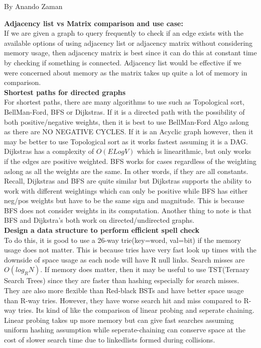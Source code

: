 \documentclass[11pt,fleqn]{article}
\begin{document}
By Anando Zaman


\textbf{Adjacency list vs Matrix comparison and use case:}\\


If we are given a graph to query frequently to check if an edge exists with the available options of using adjacency list or adjacency matrix without considering memory usage, then adjacency matrix is best since it can do this at constant time by checking if something is connected. Adjacency list would be effective if we were concerned about memory as the matrix takes up quite a lot of memory in comparison.\\


\textbf{Shortest paths for directed graphs}\\


For shortest paths, there are many algorithms to use such as Topological sort, BellMan-Ford, BFS or Dijkstras. If it is a directed path with the possibility of both positive/negative weights, then it is best to use BellMan-Ford Algo aslong as there are NO NEGATIVE CYCLES. If it is an Acyclic graph however, then it may be better to use Topological sort as it works fastest assuming it is a DAG. Dijkstras has a complexity of $O(E Log V)$ which is linearithmic, but only works if the edges are positive weighted. BFS works for cases regardless of the weighting aslong as all the weights are the same. In other words, if they are all constants. Recall, Dijkstras and BFS are quite similar but Dijkstras supports the ability to work with different weightings which can only be positive while BFS has either neg/pos weights but have to be the same sign and magnitude. This is because BFS does not consider weights in its computation. Another thing to note is that BFS and Dijkstra's both work on directed/undirected graphs.\\


\textbf{Design a data structure to perform efficient spell check}\\


To do this, it is good to use a 26-way trie(key=word, val=bit) if the memory usage does not matter. This is because tries have very fast look up times with the downside of space usage as each node will have R null links. Search misses are $O(log_RN)$. If memory does matter, then it may be useful to use TST(Ternary Search Trees) since they are faster than hashing especially for search misses. They are also more flexible than Red-black BSTs and have better space usage than R-way tries. However, they have worse search hit and miss compared to R-way tries. Its kind of like the comparison of linear probing and seperate chaining. Linear probing takes up more memory but can give fast searches assuming uniform hashing assumption while seperate-chaining can conserve space at the cost of slower search time due to linkedlists formed during collisions.\\
\end{document}
